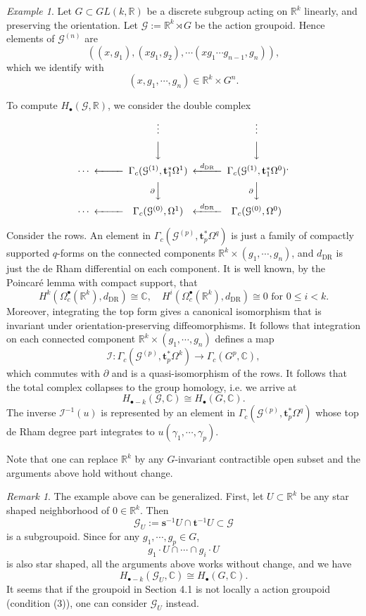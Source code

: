 \documentclass[a4paper]{amsart}
\newcommand{\DR}{\operatorname{DR}}
\newcommand{\CC}{\mathbb C}
\newcommand{\RR}{\mathbb R}
\newcommand{\maG}{\mathcal G}
\newcommand{\maI}{\mathcal I}
\newcommand{\bs}{\mathbf{s}}
\newcommand{\bt}{\mathbf{t}}
\newcommand\<{\langle}
\renewcommand\>{\rangle}
\theoremstyle{definition}
\theoremstyle{remark}
\newtheorem{rem}[theorem]{Remark}
\newtheorem{ex}[theorem]{Example}
\begin{document}
\begin{ex}
\label{ThomEx}
Let $G \subset G L (k, \RR)$ be a discrete subgroup acting on $\RR ^k$ linearly, and preserving the orientation.
Let $ \maG := \RR ^k \rtimes G$ be the action groupoid.
Hence elements of $\maG ^{(n)}$ are
$$ ((x, g_1), (x g_1 , g_2), \cdots (x g_1 \cdots g_{n-1}, g_n)),$$
which we identify with
$$ (x, g_1, \cdots , g_n) \in \RR ^k \times G^n .$$

To compute $H _\bullet (\maG , \RR)$, we consider the double complex
$$
\begin{CD}
@. \vdots @. \vdots \\
@. @VVV @VVV \\
\cdots @<<< \Gamma_c (\maG ^{(1)} , \bt_1^* \Omega ^1) @<{d _{\DR}}<< \Gamma_c (\maG ^{(1)} , \bt_1^* \Omega ^0) \\
@. @V{\partial}VV @V{\partial}VV \\
\cdots @<<< \Gamma_c (\maG ^{(0)} , \Omega ^1) @<{d _{\DR}}<< \Gamma_c (\maG ^{(0)} , \Omega ^0)
\end{CD}.
$$

Consider the rows.
An element in $\Gamma_c (\maG ^{(p)} , \bt_p^* \Omega ^q)$
is just a family of compactly supported $q$-forms on the connected components
$\RR ^k \times {(g_1, \cdots , g_n)}$,
and $d_{\DR}$ is just the de Rham differential on each component.
It is well known, by the Poincar\'e lemma with compact support, that
$$ H^k (\Omega _c ^\bullet (\RR ^k) , d _{\DR}) \cong \CC, \quad H ^i (\Omega _c ^\bullet (\RR ^k), d _{\DR}) \cong 0
\text{ for $0 \leq i < k$}. $$
Moreover, integrating the top form gives a canonical isomorphism that is invariant under orientation-preserving diffeomorphisms.
It follows that integration on each connected component
$\RR ^k \times {(g_1, \cdots , g_n)}$
defines a map
$$\maI : \Gamma_c (\maG ^{(p)} , \bt_p^* \Omega ^k) \to \Gamma _c (G^p, \CC),$$
which commutes with $\partial$ and is a quasi-isomorphism of the rows.
It follows that the total complex collapses to the group homology, i.e. we arrive at
$$ H _{\bullet - k} (\maG , \CC) \cong H _\bullet (G, \CC) .$$
The inverse $\maI ^{-1} (u)$ is represented by an element in $\Gamma_c (\maG^{(p)} , \bt_p^* \Omega ^q)$
whose top de Rham degree part integrates to $u (\gamma _1, \cdots, \gamma _p)$.

Note that one can replace $\RR ^k$ by any $G$-invariant contractible open subset and the arguments above hold without change.
\end{ex}

\begin{rem}
The example above can be generalized.
First, let $U \subset \RR ^k$ be any star shaped neighborhood of $0 \in \RR ^k$.
Then
$$ \maG _U := \bs ^{-1} U \cap \bt ^{-1} U \subset \maG $$
is a subgroupoid.
Since for any $g_1, \cdots , g_p \in G$,
$$ g_1 \cdot U \cap \cdots \cap g_i \cdot U $$
is also star shaped,
all the arguments above works without change, and we have
$$ H _{\bullet - k} (\maG _U , \CC) \cong H _\bullet (G, \CC) .$$
It seems that if the groupoid in Section 4.1 is not locally a action groupoid (condition (3)),
one can consider $\maG _U $ instead.
\end{rem}
\end{document}
